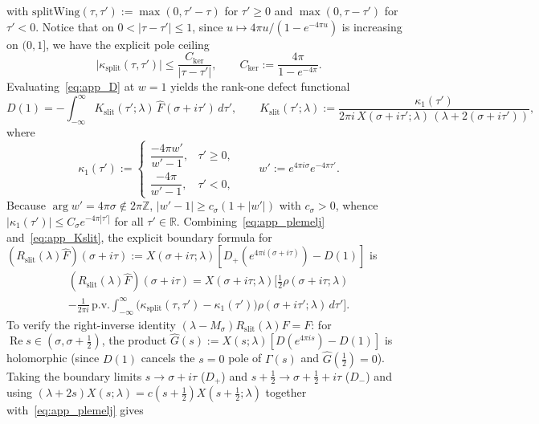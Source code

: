 \documentclass[11pt,a4paper]{article}
\begin{document}
with $\mathrm{splitWing}(\tau,\tau'):=\max(0,\tau'-\tau)$ for $\tau'\ge 0$ and $\max(0,\tau-\tau')$
for $\tau'<0$.  Notice that on $0<|\tau-\tau'|\le 1$, since $u\mapsto 4\pi u/(1-e^{-4\pi u})$ is
increasing on $(0,1]$, we have the explicit pole ceiling
\begin{equation}\label{eq:app_Cker}
\bigl|\kappa_{\mathrm{split}}(\tau,\tau')\bigr| \le \frac{C_{\mathrm{ker}}}{|\tau-\tau'|},
\qquad C_{\mathrm{ker}} := \frac{4\pi}{1-e^{-4\pi}}.
\end{equation}
Evaluating~\eqref{eq:app_D} at $w=1$ yields the rank-one defect functional
\begin{equation}\label{eq:app_Kslit}
D(1) = -\int_{-\infty}^\infty K_{\mathrm{slit}}(\tau';\lambda)\,\widehat{F}(\sigma+i\tau')\,d\tau',
\qquad
K_{\mathrm{slit}}(\tau';\lambda) := \frac{\kappa_1(\tau')}{2\pi i\,X(\sigma+i\tau';\lambda)\,(\lambda+2(\sigma+i\tau'))},
\end{equation}
where
\[
\kappa_1(\tau') :=
\begin{cases}
\dfrac{-4\pi w'}{w'-1}, & \tau'\ge 0, \\[8pt]
\dfrac{-4\pi}{w'-1}, & \tau'<0,
\end{cases}
\qquad w' := e^{4\pi i\sigma} e^{-4\pi\tau'}.
\]
Because $\arg w'=4\pi\sigma\notin 2\pi\mathbb{Z}$, $|w'-1|\ge c_\sigma(1+|w'|)$ with $c_\sigma>0$,
whence $|\kappa_1(\tau')|\le C_\sigma e^{-4\pi|\tau'|}$ for all $\tau'\in\mathbb{R}$.
Combining~\eqref{eq:app_plemelj} and~\eqref{eq:app_Kslit}, the explicit boundary formula for
$(R_{\mathrm{slit}}(\lambda)\widehat{F})(\sigma+i\tau) := X(\sigma+i\tau;\lambda)[D_+(e^{4\pi i(\sigma+i\tau)})-D(1)]$ is
\begin{multline}\label{eq:app_Rslit_explicit}
(R_{\mathrm{slit}}(\lambda)\widehat{F})(\sigma+i\tau)
= X(\sigma+i\tau;\lambda)\Biggl[
  \frac{1}{2}\rho(\sigma+i\tau;\lambda) \\
  - \frac{1}{2\pi i}\,\mathrm{p.v.}\int_{-\infty}^\infty
    \bigl(\kappa_{\mathrm{split}}(\tau,\tau')-\kappa_1(\tau')\bigr)\rho(\sigma+i\tau';\lambda)\,d\tau'
\Biggr].
\end{multline}
To verify the right-inverse identity $(\lambda-M_\sigma)R_{\mathrm{slit}}(\lambda)F=F$:
for $\operatorname{Re}s\in(\sigma,\sigma+\tfrac12)$, the product $\widehat{G}(s):=X(s;\lambda)[D(e^{4\pi i s})-D(1)]$ is
holomorphic (since $D(1)$ cancels the $s=0$ pole of $\Gamma(s)$ and $\widehat{G}(\tfrac12)=0$).
Taking the boundary limits $s\to\sigma+i\tau$ ($D_+$) and $s+\tfrac12\to\sigma+\tfrac12+i\tau$ ($D_-$)
and using $(\lambda+2s)X(s;\lambda)=c(s+\tfrac12)X(s+\tfrac12;\lambda)$ together with~\eqref{eq:app_plemelj} gives
\end{document}
